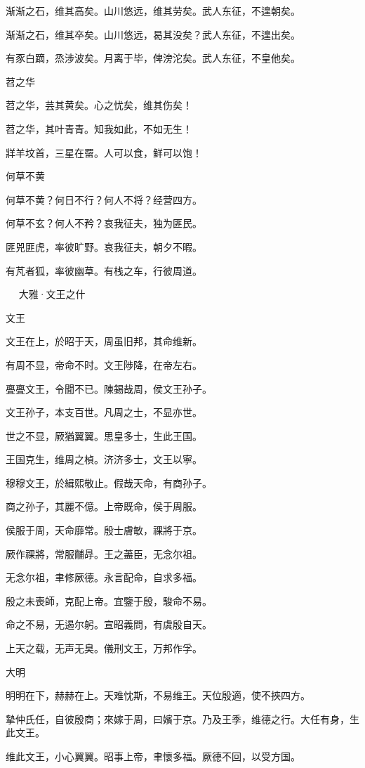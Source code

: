 渐渐之石，维其高矣。山川悠远，维其劳矣。武人东征，不遑朝矣。

渐渐之石，维其卒矣。山川悠远，曷其没矣？武人东征，不遑出矣。

有豕白蹢，烝涉波矣。月离于毕，俾滂沱矣。武人东征，不皇他矣。

苕之华

苕之华，芸其黄矣。心之忧矣，维其伤矣！

苕之华，其叶青青。知我如此，不如无生！

牂羊坟首，三星在罶。人可以食，鲜可以饱！

何草不黄

何草不黄？何日不行？何人不将？经营四方。

何草不玄？何人不矜？哀我征夫，独为匪民。

匪兕匪虎，率彼旷野。哀我征夫，朝夕不暇。

有芃者狐，率彼幽草。有栈之车，行彼周道。



　
大雅·文王之什


文王

文王在上，於昭于天，周虽旧邦，其命维新。

有周不显，帝命不时。文王陟降，在帝左右。

亹亹文王，令聞不已。陳錫哉周，侯文王孙子。

文王孙子，本支百世。凡周之士，不显亦世。

世之不显，厥猶翼翼。思皇多士，生此王国。

王国克生，维周之楨。济济多士，文王以寧。

穆穆文王，於緝熙敬止。假哉天命，有商孙子。

商之孙子，其麗不億。上帝既命，侯于周服。

侯服于周，天命靡常。殷士膚敏，祼將于京。

厥作祼將，常服黼冔。王之藎臣，无念尔祖。

无念尔祖，聿修厥德。永言配命，自求多福。

殷之未喪師，克配上帝。宜鑒于殷，駿命不易。

命之不易，无遏尔躬。宣昭義問，有虞殷自天。

上天之载，无声无臭。儀刑文王，万邦作孚。

大明

明明在下，赫赫在上。天难忱斯，不易维王。天位殷適，使不挾四方。

摯仲氏任，自彼殷商；來嫁于周，曰嬪于京。乃及王季，维德之行。大任有身，生此文王。

维此文王，小心翼翼。昭事上帝，聿懷多福。厥德不回，以受方国。

